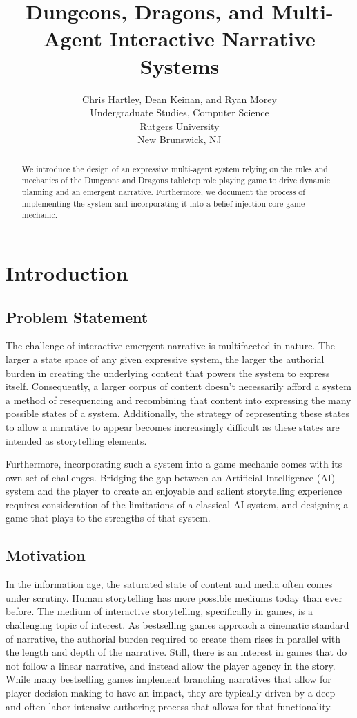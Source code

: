 \documentclass[letterpaper, 10 pt, conference]{ieeeconf}  %
\title{\LARGE \bf
Dungeons, Dragons, and Multi-Agent Interactive Narrative Systems
}
\author{
	Chris Hartley, Dean Keinan, and Ryan Morey\\%
	Undergraduate Studies, Computer Science\\
	Rutgers University\\
	New Brunswick, NJ\\
}
\begin{document}
\maketitle
\thispagestyle{empty}
\pagestyle{empty}


\begin{abstract}

We introduce the design of an expressive multi-agent system relying on the rules and mechanics of the Dungeons and Dragons tabletop role playing game to drive dynamic planning and an emergent narrative. Furthermore, we document the process of implementing the system and incorporating it into a belief injection core game mechanic.

\end{abstract}


\section{Introduction}
\subsection{Problem Statement}The challenge of interactive emergent narrative is multifaceted in nature. The larger a state space of any given expressive system, the larger the authorial burden in creating the underlying content that powers the system to express itself. Consequently, a larger corpus of content doesn't necessarily afford a system a method of resequencing and recombining that content into expressing the many possible states of a system. Additionally, the strategy of representing these states to allow a narrative to appear becomes increasingly difficult as these states are intended as storytelling elements. 

Furthermore, incorporating such a system into a game mechanic comes with its own set of challenges. Bridging the gap between an Artificial Intelligence (AI) system and the player to create an enjoyable and salient storytelling experience requires consideration of the limitations of a classical AI system, and designing a game that plays to the strengths of that system.
\subsection{Motivation}
In the information age, the saturated state of content and media often comes under scrutiny. 
Human storytelling has more possible mediums today than ever before. The medium of interactive storytelling, specifically in games, is a challenging topic of interest. As bestselling games approach a cinematic standard of narrative, the authorial burden required to create them rises in parallel with the length and depth of the narrative. Still, there is an interest in games that do not follow a linear narrative, and instead allow the player agency in the story. While many bestselling games implement branching narratives that allow for player decision making to have an impact, they are typically driven by a deep and often labor intensive authoring process that allows for that functionality.
\end{document}
